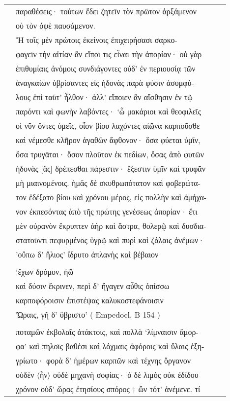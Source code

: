 \documentclass[a4paper,12pt]{article}
\begin{document}
\begin{center}
\begin{xtabular}{p{1cm}p{10.5454545454545cm}p{0.8cm}p{0cm}}
&παραθέσεις· τούτων ἔδει ζητεῖν τὸν πρῶτον ἀρξάμενον &&\\
&οὐ τὸν ὀψὲ παυσάμενον. &&\\
&Ἢ τοῖς μὲν πρώτοις ἐκείνοις ἐπιχειρήσασι σαρκο-&&\\
&φαγεῖν τὴν αἰτίαν ἂν εἴποι τις εἶναι τὴν ἀπορίαν· οὐ γὰρ &&\\
&ἐπιθυμίαις ἀνόμοις συνδιάγοντες οὐδ’ ἐν περιουσίᾳ τῶν &&\\
&ἀναγκαίων ὑβρίσαντες εἰς ἡδονὰς παρὰ φύσιν ἀσυμφύ-&&\\
&λους ἐπὶ ταῦτ’ ἦλθον· ἀλλ’ εἴποιεν ἂν αἴσθησιν ἐν τῷ &&\\
&παρόντι καὶ φωνὴν λαβόντες· ‘ὦ μακάριοι καὶ θεοφιλεῖς &&\\
&οἱ νῦν ὄντες ὑμεῖς, οἷον βίου λαχόντες αἰῶνα καρποῦσθε &&\\
&καὶ νέμεσθε κλῆρον ἀγαθῶν ἄφθονον· ὅσα φύεται ὑμῖν,  &&\\
&ὅσα τρυγᾶται· ὅσον πλοῦτον ἐκ πεδίων, ὅσας ἀπὸ φυτῶν &&\\
&ἡδονὰς [ἃς] δρέπεσθαι πάρεστιν· ἔξεστιν ὑμῖν καὶ τρυφᾶν &&\\
&μὴ μιαινομένοις. ἡμᾶς δὲ σκυθρωπότατον καὶ φοβερώτα-&&\\
&τον ἐδέξατο βίου καὶ χρόνου μέρος, εἰς πολλὴν καὶ ἀμήχα-&&\\
&νον ἐκπεσόντας ἀπὸ τῆς πρώτης γενέσεως ἀπορίαν· ἔτι &&\\
&μὲν οὐρανὸν ἔκρυπτεν ἀὴρ καὶ ἄστρα, θολερῷ καὶ δυσδια-&&\\
&στατοῦντι πεφυρμένος ὑγρῷ καὶ πυρὶ καὶ ζάλαις ἀνέμων· &&\\
&’οὔπω δ’ ἥλιος’ ἵδρυτο ἀπλανὴς καὶ βέβαιον &&\\
&
 &&\\
&‘ἔχων δρόμον, ἠῶ &&\\
&καὶ δύσιν ἔκρινεν, περὶ δ’ ἤγαγεν αὖθις ὀπίσσω &&\\
&καρποφόροισιν ἐπιστέψας καλυκοστεφάνοισιν &&\\
&Ὥραις, γῆ δ’ ὕβριστο’ ( \latin{}Empedocl. B 154 \greek{}) &&\\
&
 &&\\
&ποταμῶν ἐκβολαῖς ἀτάκτοις, καὶ πολλὰ ‘λίμναισιν ἄμορ-&&\\
&φα’ καὶ πηλοῖς βαθέσι καὶ λόχμαις ἀφόροις καὶ ὕλαις ἐξη-&&\\
&γρίωτο· φορὰ δ’ ἡμέρων καρπῶν καὶ τέχνης ὄργανον &&\\
&οὐδὲν 〈ἦν〉 οὐδὲ μηχανὴ σοφίας· ὁ δὲ λιμὸς οὐκ ἐδίδου &&\\
&χρόνον οὐδ’ ὥρας ἐτησίους σπόρος † ὢν τότ’ ἀνέμενε. τί &&\\

\end{xtabular}
\end{center}
\end{document}
